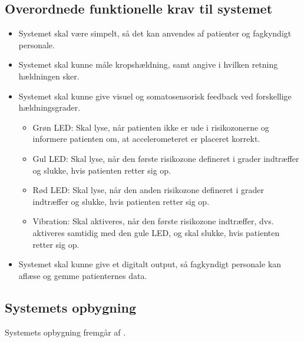 \subsection{Overordnede funktionelle krav til systemet}\label{FunkKrav}
\begin{itemize}
	\item Systemet skal være simpelt, så det kan anvendes af patienter og fagkyndigt personale.
	\item Systemet skal kunne måle kropshældning, samt angive i hvilken retning hældningen sker. 
	\item Systemet skal kunne give visuel og somatosensorisk feedback ved forskellige hældningsgrader.
	\begin{itemize}
		\item Grøn LED: Skal lyse, når patienten ikke er ude i risikozonerne og informere patienten om, at accelerometeret er placeret korrekt.  
		\item Gul LED: Skal lyse, når den første risikozone defineret i grader indtræffer og slukke, hvis patienten retter sig op.
		\item Rød LED: Skal lyse, når den anden risikozone defineret i grader indtræffer og slukke, hvis patienten retter sig op.
		\item Vibration: Skal aktiveres, når den første risikozone indtræffer, dvs. aktiveres samtidig med den gule LED, og skal slukke, hvis patienten retter sig op.
	\end{itemize}
	\item Systemet skal kunne give et digitalt output, så fagkyndigt personale kan aflæse og gemme patienternes data.
\end{itemize}

\subsection{Systemets opbygning}\label{ref:blokdiagram}
Systemets opbygning fremgår af .

